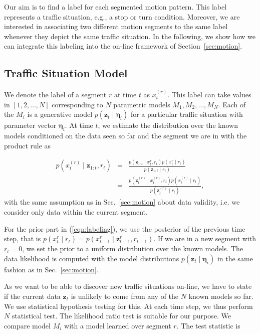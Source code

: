 Our aim is to find a label for each segmented motion pattern. This label
represents a traffic situation, e.g., a stop or turn condition. Moreover, we are
interested in associating two different motion segments to the same label
whenever they depict the same traffic situation. In the following, we show how
we can integrate this labeling into the on-line framework of
Section~\ref{sec:motion}.

\subsection{Traffic Situation Model}
We denote the label of a segment $r$ at time $t$ as $x_t^{(r)}$. This
label can take values in $[1,2,\dots,N]$ corresponding to $N$
parametric models $M_1,M_2,\dots,M_N$. Each of the $M_i$ is a
generative model $p(\mathbf{z}_t\mid\boldsymbol{\eta}_i)$ for a
particular traffic situation with parameter vector
$\boldsymbol{\eta}_i$. At time $t$, we estimate the distribution over
the known models conditioned on the data seen so far and the segment
we are in with the product rule as

\begin{eqnarray}
\label{eqn:labeling}
p(x_t^{(r)}\mid \mathbf{z}_{1:t},r_t) &=& \frac{p(\mathbf{z}_{1:t}\mid x_t^r,r_t)p(x_t^r\mid r_t)}
  {p(\mathbf{z}_{1:t}\mid r_t)}\nonumber\\
                         &=& \frac{p(\mathbf{z}_t^{(r)}\mid x_t^{(r)},r_t)p(x_t^{(r)}\mid r_t)}
  {p(\mathbf{z}_t^{(r)}\mid r_t)},
\end{eqnarray}
with the same assumption as in Sec.~\ref{sec:motion} about data
validity, i.e. we consider only data within the current segment.

For the prior part in (\ref{eqn:labeling}), we use the posterior of the previous
time step, that is
$p(x_t^r\mid r_t)=p(x_{t-1}^r\mid \mathbf{z}_{t-1}^r,r_{t-1})$. If we are in a new
segment with $r_t=0$, we set the prior to a uniform distribution over the known
models. The data likelihood is computed with the model distributions
$p(\mathbf{z}_t\mid \boldsymbol{\eta}_i)$ in the same fashion as in Sec.~\ref{sec:motion}.

As we want to be able to discover new traffic situations on-line, we
have to state if the current data $\mathbf{z}_t$ is unlikely to come
from any of the $N$ known models so far. We use statistical hypothesis
testing for this. At each time step, we thus perform $N$ statistical
test. The likelihood ratio test is suitable for our purpose. We
compare model $M_i$ with a model learned over segment $r$. The test
statistic is

